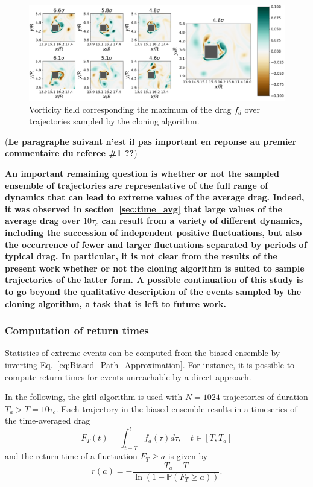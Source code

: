 \documentclass{jfm}
\begin{document}
\begin{figure}
	\centering
	\includegraphics[width=\linewidth]{illustr_extrms_vorticity_GKTL/illustr_extrms_vorticity_GKTL}
	\caption{Vorticity field corresponding the maximum of the drag $f_d$ over trajectories sampled by the cloning algorithm.}
	\label{fig:illustr_extrms_vorticity_GKTL}
\end{figure}

(\textbf{Le paragraphe suivant n'est il pas important en reponse au premier commentaire du referee \#1 ??})

\textbf{An important remaining question is whether or not the sampled ensemble of trajectories are representative of the full range of dynamics that can lead to extreme values of the average drag.
Indeed, it was observed in section~\ref{sec:time_avg} that large values of the average drag over $10\tau_c$ can result from a variety of different
dynamics, including the succession of independent positive fluctuations, but also the occurrence of fewer and larger fluctuations separated by periods of typical drag.
In particular, it is not clear from the results of the present work whether or not the cloning algorithm is suited to sample trajectories of the latter form.
A possible continuation of this study is to go beyond the qualitative description of the events sampled by the cloning algorithm, a task that is left to future work.}



\subsubsection{Computation of return times}
\label{sec:return_times}


Statistics of extreme events can be computed from the biased ensemble by inverting Eq.~\eqref{eq:Biased_Path_Approximation}. For instance, it is possible to compute return times for
events unreachable by a direct approach.

In the following, the \ac{gktl} algorithm is used with $N=1024$ trajectories of duration $T_a > T= 10\tau_c$.
Each trajectory in the biased ensemble results in a timeseries of the time-averaged drag
\begin{equation}
\label{eq:time_averaged}
F_T(t) = \int_{t-T}^{t}f_d(\tau)d\tau, \quad t\in [T,T_a]  
\end{equation}
and the return time of a fluctuation $F_T \geq a$ is given by~\cite{lestang_computing_2018}
\begin{equation}
r(a) = - \frac{T_a - T}{\ln (1-\mathbb{P}(F_T \geq a))}.
\end{equation}
\end{document}
